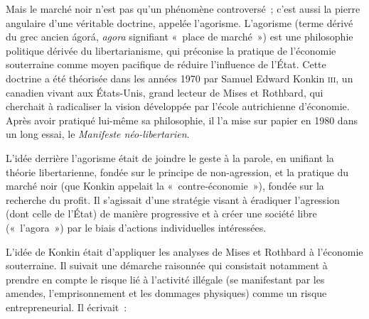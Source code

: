 
Mais le marché noir n'est pas qu'un phénomène controversé~; c'est aussi la pierre angulaire d'une véritable doctrine, appelée l'agorisme. L'agorisme (terme dérivé du grec ancien \foreignlanguage{greek}{ágorá}, \emph{agora} signifiant «~place de marché~») est une philosophie politique dérivée du libertarianisme, qui préconise la pratique de l'économie souterraine comme moyen pacifique de réduire l'influence de l'État. Cette doctrine a été théorisée dans les années 1970 par Samuel Edward Konkin \textsc{iii}, un canadien vivant aux États-Unis, grand lecteur de Mises et Rothbard, qui cherchait à radicaliser la vision développée par l'école autrichienne d'économie. Après avoir pratiqué lui-même sa philosophie, il l'a mise sur papier en 1980 dans un long essai, le \emph{Manifeste néo-libertarien}.

L'idée derrière l'agorisme était de joindre le geste à la parole, en unifiant la théorie libertarienne, fondée sur le principe de non-agression, et la pratique du marché noir (que Konkin appelait la «~contre-économie~»), fondée sur la recherche du profit. Il s'agissait d'une stratégie visant à éradiquer l'agression (dont celle de l'État) de manière progressive et à créer une société libre («~l'agora~») par le biais d'actions individuelles intéressées.

L'idée de Konkin était d'appliquer les analyses de Mises et Rothbard à l'économie souterraine. Il suivait une démarche raisonnée qui consistait notamment à prendre en compte le risque lié à l'activité illégale (se manifestant par les amendes, l'emprisonnement et les dommages physiques) comme un risque entrepreneurial. Il écrivait~:

